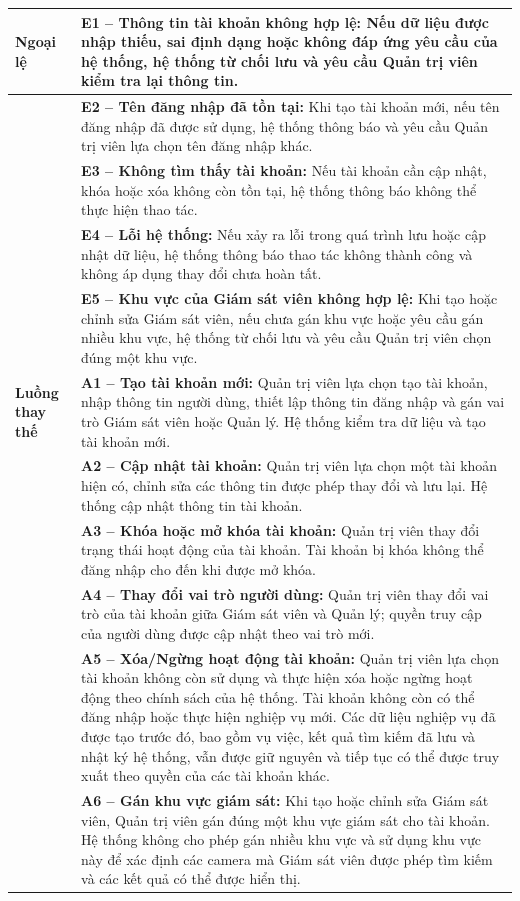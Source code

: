 \begin{longtable}{|>{\raggedright\arraybackslash}p{2.9cm}|p{12.3cm}|}
\textbf{Ngoại lệ} & \textbf{E1 -- Thông tin tài khoản không hợp lệ:} Nếu dữ liệu được nhập thiếu, sai định dạng hoặc không đáp ứng yêu cầu của hệ thống, hệ thống từ chối lưu và yêu cầu Quản trị viên kiểm tra lại thông tin. \\ \cline{2-2}
 & \textbf{E2 -- Tên đăng nhập đã tồn tại:} Khi tạo tài khoản mới, nếu tên đăng nhập đã được sử dụng, hệ thống thông báo và yêu cầu Quản trị viên lựa chọn tên đăng nhập khác. \\ \cline{2-2}
 & \textbf{E3 -- Không tìm thấy tài khoản:} Nếu tài khoản cần cập nhật, khóa hoặc xóa không còn tồn tại, hệ thống thông báo không thể thực hiện thao tác. \\ \cline{2-2}
 & \textbf{E4 -- Lỗi hệ thống:} Nếu xảy ra lỗi trong quá trình lưu hoặc cập nhật dữ liệu, hệ thống thông báo thao tác không thành công và không áp dụng thay đổi chưa hoàn tất. \\ \cline{2-2}
 & \textbf{E5 -- Khu vực của Giám sát viên không hợp lệ:} Khi tạo hoặc chỉnh sửa Giám sát viên, nếu chưa gán khu vực hoặc yêu cầu gán nhiều khu vực, hệ thống từ chối lưu và yêu cầu Quản trị viên chọn đúng một khu vực. \\ \hline
\textbf{Luồng thay thế} & \textbf{A1 -- Tạo tài khoản mới:} Quản trị viên lựa chọn tạo tài khoản, nhập thông tin người dùng, thiết lập thông tin đăng nhập và gán vai trò Giám sát viên hoặc Quản lý. Hệ thống kiểm tra dữ liệu và tạo tài khoản mới. \\ \cline{2-2}
 & \textbf{A2 -- Cập nhật tài khoản:} Quản trị viên lựa chọn một tài khoản hiện có, chỉnh sửa các thông tin được phép thay đổi và lưu lại. Hệ thống cập nhật thông tin tài khoản. \\ \cline{2-2}
 & \textbf{A3 -- Khóa hoặc mở khóa tài khoản:} Quản trị viên thay đổi trạng thái hoạt động của tài khoản. Tài khoản bị khóa không thể đăng nhập cho đến khi được mở khóa. \\ \cline{2-2}
 & \textbf{A4 -- Thay đổi vai trò người dùng:} Quản trị viên thay đổi vai trò của tài khoản giữa Giám sát viên và Quản lý; quyền truy cập của người dùng được cập nhật theo vai trò mới. \\ \cline{2-2}
 & \textbf{A5 -- Xóa/Ngừng hoạt động tài khoản:} Quản trị viên lựa chọn tài khoản không còn sử dụng và thực hiện xóa hoặc ngừng hoạt động theo chính sách của hệ thống. Tài khoản không còn có thể đăng nhập hoặc thực hiện nghiệp vụ mới. Các dữ liệu nghiệp vụ đã được tạo trước đó, bao gồm vụ việc, kết quả tìm kiếm đã lưu và nhật ký hệ thống, vẫn được giữ nguyên và tiếp tục có thể được truy xuất theo quyền của các tài khoản khác. \\ \cline{2-2}
 & \textbf{A6 -- Gán khu vực giám sát:} Khi tạo hoặc chỉnh sửa Giám sát viên, Quản trị viên gán đúng một khu vực giám sát cho tài khoản. Hệ thống không cho phép gán nhiều khu vực và sử dụng khu vực này để xác định các camera mà Giám sát viên được phép tìm kiếm và các kết quả có thể được hiển thị. \\ \hline
\end{longtable}

